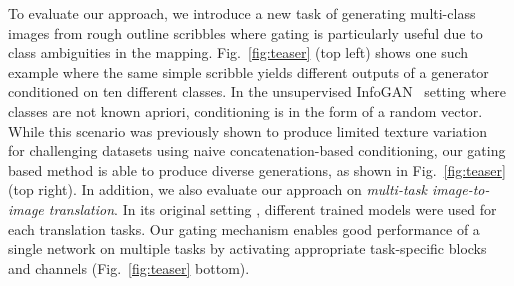 To evaluate our approach, we introduce a new task of generating multi-class images from rough outline scribbles where gating is particularly useful due to class ambiguities in the mapping. Fig.~\ref{fig:teaser} (top left) shows one such example where the same simple scribble yields different outputs of a generator conditioned on ten different classes.
In the unsupervised InfoGAN~\cite{chen2016infogan} setting where classes are not known apriori, conditioning is in the form of a random vector. 
While this scenario was previously shown to produce limited texture variation~\cite{ghosh2017multi} for challenging datasets using naive concatenation-based conditioning, our gating based method is able to produce diverse generations, as shown in Fig.~\ref{fig:teaser} (top right).
In addition, we also evaluate our approach on {\em multi-task image-to-image translation}. 
In its original setting \cite{isola2016image2image}, different trained models were used for each translation tasks. 
Our gating mechanism enables good performance of a single network on multiple tasks by activating appropriate task-specific blocks and channels (Fig.~\ref{fig:teaser} bottom).











